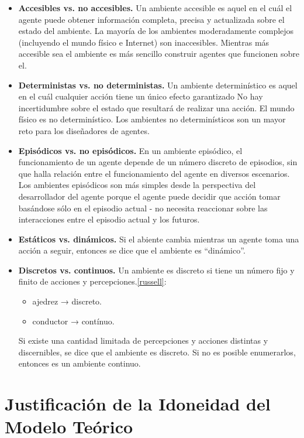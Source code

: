\documentclass[a4paper,12pt,oneside]{book}
\begin{document}
\begin{itemize}
\item {\bf Accesibles vs. no accesibles.}
Un ambiente accesible es aquel en el cuál el agente puede
obtener información completa, precisa y actualizada sobre el
estado del ambiente. La mayoría de los ambientes
moderadamente complejos (incluyendo el mundo físico e
Internet) son inaccesibles. Mientras más accesible sea el
ambiente es más sencillo construir agentes que funcionen sobre el.

\item {\bf Deterministas vs. no deterministas.}
  Un ambiente determinístico es aquel en el cuál cualquier acción tiene un
único efecto garantizado No hay incertidumbre sobre el estado que
resultará de realizar una acción. El mundo físico es no
determinístico. Los ambientes no determinísticos son un mayor reto
para los diseñadores de agentes.

\item {\bf Episódicos vs. no episódicos.}
 En un ambiente episódico, el funcionamiento de un agente depende de
 un número discreto de episodios, sin que halla relación entre el
 funcionamiento del agente en diversos escenarios. Los ambientes episódicos son
más simples desde la perspectiva del desarrollador del agente porque
el agente puede decidir que acción tomar basándose sólo en el episodio
actual - no necesita reaccionar sobre las interacciones entre el episodio actual y los futuros.

\item {\bf Estáticos vs. dinámicos.} Si el abiente cambia mientras un
  agente toma una acción a seguir, entonces se dice que el ambiente es
  ``dinámico''. 
\item {\bf Discretos vs. continuos.}                         
Un ambiente es discreto si tiene un número fijo y finito de acciones y
percepciones.\ref{russell}:
\begin{itemize}
   \item ajedrez → discreto.
    \item conductor → contínuo.
  \end{itemize}
 Si existe una cantidad limitada de
  percepciones y acciones distintas y discernibles, se dice que el
  ambiente es discreto. Si no es posible enumerarlos, entonces es un
  ambiente continuo.
\end{itemize}


\chapter{Justificación de la Idoneidad del Modelo Teórico}
\end{document}
